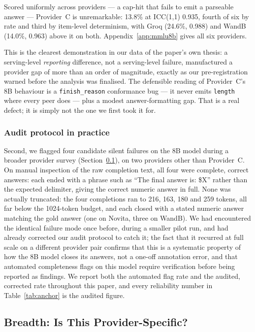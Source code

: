 \documentclass[11pt]{article}
\begin{document}
Scored uniformly across providers --- a cap-hit that fails to emit a
parseable answer --- Provider~C is unremarkable: 13.8\% at ICC(1,1)
0.935, fourth of six by rate and third by item-level determinism, with
Groq (24.6\%, 0.988) and WandB (14.0\%, 0.963) above it on both.
Appendix~\ref{app:mmlu8b} gives all six providers.

This is the clearest demonstration in our data of the paper's own
thesis: a serving-level \emph{reporting} difference, not a
serving-level failure, manufactured a provider gap of more than an
order of magnitude, exactly as our pre-registration warned before the
analysis was finalised. The defensible reading of Provider~C's 8B
behaviour is a \texttt{finish\_reason} conformance bug --- it never
emits \texttt{length} where every peer does --- plus a modest
answer-formatting gap. That is a real defect; it is simply not the one
we first took it for.

\subsubsection{Audit protocol in practice}
\label{sec:audit}

Second, we flagged four candidate silent failures on the 8B model
during a broader provider survey (Section~\ref{sec:breadth}), on two
providers other than Provider~C. On manual inspection of the raw
completion text, all four were complete, correct answers: each ended
with a phrase such as ``The final answer is: \$X'' rather than the
expected delimiter, giving the correct numeric answer in full. None
was actually truncated: the four completions ran to 216, 163, 180 and
259 tokens, all far below the 1024-token budget, and each closed with
a stated numeric answer matching the gold answer (one on Novita, three
on WandB).
We had encountered the identical failure mode once before, during a
smaller pilot run, and had already corrected our audit protocol to
catch it; the fact that it recurred at full scale on a different
provider pair confirms that this is a systematic property of how the
8B model closes its answers, not a one-off annotation error, and that
automated completeness flags on this model require verification
before being reported as findings. We report both the automated flag
rate and the audited, corrected rate throughout this paper, and every
reliability number in Table~\ref{tab:anchor} is the audited figure.

\subsection{Breadth: Is This Provider-Specific?}
\label{sec:breadth}
\end{document}
